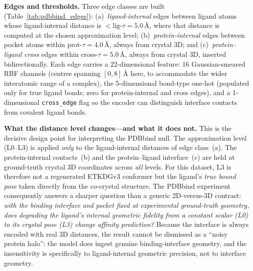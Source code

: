 \documentclass[pdflatex,sn-vancouver-num]{sn-jnl}%
\theoremstyle{thmstyleone}%
\theoremstyle{thmstyletwo}%
\theoremstyle{thmstylethree}%
\begin{document}
\textbf{Edges and thresholds.}  Three edge classes are built (Table~\ref{tab:pdbbind_edges}): (a)~\emph{ligand-internal} edges between ligand atoms whose ligand-internal distance is $< \mathrm{lig}\text{-}\tau = 5.0$\,\AA, where that distance is computed at the chosen approximation level; (b)~\emph{protein-internal} edges between pocket atoms within $\mathrm{prot}\text{-}\tau = 4.0$\,\AA, always from crystal 3D; and (c)~\emph{protein--ligand cross} edges within $\mathrm{cross}\text{-}\tau = 5.0$\,\AA, always from crystal 3D, inserted bidirectionally.  Each edge carries a 22-dimensional feature: 16 Gaussian-smeared RBF channels (centres spanning $[0,8]$\,\AA{} here, to accommodate the wider interatomic range of a complex), the 5-dimensional bond-type one-hot (populated only for true ligand bonds; zero for protein-internal and cross edges), and a 1-dimensional \texttt{cross\_edge} flag so the encoder can distinguish interface contacts from covalent ligand bonds.

\textbf{What the distance level changes---and what it does not.}  This is the decisive design point for interpreting the PDBbind null.  The approximation level (L0--L3) is applied \emph{only} to the ligand-internal distances of edge class~(a).  The protein-internal contacts~(b) and the protein--ligand interface~(c) are held at ground-truth crystal 3D coordinates across \emph{all} levels.  For this dataset, L3 is therefore not a regenerated ETKDGv3 conformer but the ligand's \emph{true bound pose} taken directly from the co-crystal structure.  The PDBbind experiment consequently answers a sharper question than a generic 2D-versus-3D contrast: \emph{with the binding interface and pocket fixed at experimental ground-truth geometry, does degrading the ligand's internal geometric fidelity from a constant scalar (L0) to its crystal pose (L3) change affinity prediction?}  Because the interface is always encoded with real 3D distances, the result cannot be dismissed as a ``noisy protein halo'': the model does ingest genuine binding-interface geometry, and the insensitivity is specifically to ligand-internal geometric precision, not to interface geometry.
\end{document}
